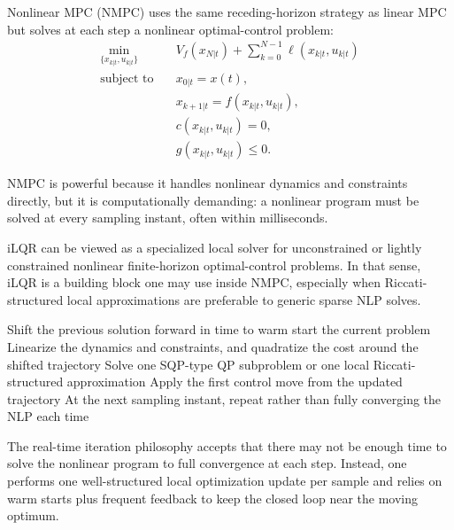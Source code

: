 \begin{definition}\label{def:l9-nonlinear-mpc}
	Nonlinear MPC (NMPC) uses the same receding-horizon strategy as linear MPC but solves at each step a nonlinear optimal-control problem:
	\begin{align*}
		\min_{\{x_{k|t},u_{k|t}\}} \quad &
		V_f(x_{N|t}) + \sum_{k=0}^{N-1}\ell(x_{k|t},u_{k|t}) \\
		\text{subject to}\quad &
		x_{0|t}=x(t), \\
		&
		x_{k+1|t}=f(x_{k|t},u_{k|t}), \\
		&
		c(x_{k|t},u_{k|t})=0, \\
		&
		g(x_{k|t},u_{k|t})\le 0.
	\end{align*}
\end{definition}

\begin{remark}
	NMPC is powerful because it handles nonlinear dynamics and constraints directly, but it is computationally demanding: a nonlinear program must be solved at every sampling instant, often within milliseconds.
\end{remark}

\begin{remark}
	iLQR can be viewed as a specialized local solver for unconstrained or lightly constrained nonlinear finite-horizon optimal-control problems. In that sense, iLQR is a building block one may use inside NMPC, especially when Riccati-structured local approximations are preferable to generic sparse NLP solves.
\end{remark}

\begin{algorithm}[H]
	\DontPrintSemicolon
	\caption{Real-Time Iteration Scheme for NMPC}
\label{alg:l9-real-time-iteration-scheme-for-nmpc}
		Shift the previous solution forward in time to warm start the current problem\;
		Linearize the dynamics and constraints, and quadratize the cost around the shifted trajectory\;
		Solve one SQP-type QP subproblem or one local Riccati-structured approximation\;
		Apply the first control move from the updated trajectory\;
		At the next sampling instant, repeat rather than fully converging the NLP each time\;
\end{algorithm}

\begin{remark}
	The real-time iteration philosophy accepts that there may not be enough time to solve the nonlinear program to full convergence at each step. Instead, one performs one well-structured local optimization update per sample and relies on warm starts plus frequent feedback to keep the closed loop near the moving optimum.
\end{remark}

